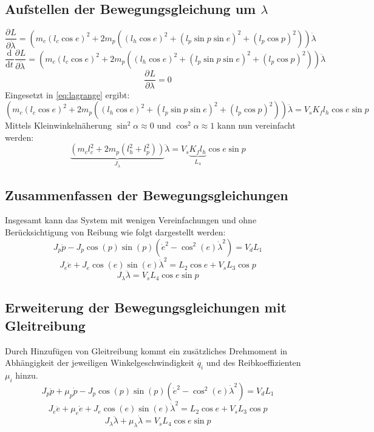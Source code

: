 \documentclass{article}
\newcommand{\partiell}[3][]{\frac{\partial^{#1}#2}{\partial{#3}^{#1}}}
\newcommand{\diff}[3][]{\frac{\mathrm{d}^{#1}#2}{\mathrm{d}{#3}^{#1}}}
\begin{document}
\subsection{Aufstellen der Bewegungsgleichung um $\lambda$}
\begin{equation}
\partiell{L}{\dot{\lambda}} = (m_c (l_c \cos e)^2
+ 2 m_p((l_h \cos e)^2 + (l_p \sin p \sin e)^2+(l_p \cos p)^2))\dot{\lambda}
\end{equation}
\begin{equation}
\diff{}{t}\partiell{L}{\dot{\lambda}} = (m_c (l_c \cos e)^2
+ 2 m_p((l_h \cos e)^2 + (l_p \sin p \sin e)^2+(l_p \cos p)^2))\ddot{\lambda}
\end{equation}
\begin{equation}
\partiell{L}{\lambda} = 0
\end{equation}
Eingesetzt in \eqref{eq:lagrange} ergibt:
\begin{equation}
(m_c (l_c \cos e)^2
+ 2 m_p((l_h \cos e)^2 + (l_p \sin p \sin e)^2+(l_p \cos p)^2))\ddot{\lambda} = V_s K_f l_h \cos e \sin p
\end{equation}
Mittels Kleinwinkelnäherung $\sin^2 \alpha \approx 0$ und $\cos^2 \alpha \approx 1$  kann nun vereinfacht werden:
\begin{equation}
\underbrace{(m_c l_c^2 +  2 m_p(l_h^2 + l_p^2))}_{J_\lambda} \ddot{\lambda} = V_s \underbrace{K_f l_h}_{L_4} \cos e \sin p
\end{equation}
\subsection{Zusammenfassen der Bewegungsgleichungen}
Insgesamt kann das System mit wenigen Vereinfachungen und ohne Berücksichtigung von Reibung wie folgt dargestellt werden:
\begin{equation}
J_p \ddot{p} - J_p \cos (p) \sin (p) (\dot{e}^2- \cos^2 (e) \dot{\lambda}^2) = V_d L_1
\end{equation}
\begin{equation}
J_e\ddot{e} + J_e \cos (e) \sin (e) \dot{\lambda}^2 
= L_2 \cos e + V_s L_3 \cos p
\end{equation}
\begin{equation}
J_\lambda \ddot{\lambda} = V_s L_4 \cos e \sin p
\end{equation}
\subsection{Erweiterung der Bewegungsgleichungen mit Gleitreibung}
Durch Hinzufügen von Gleitreibung kommt ein zusätzliches Drehmoment in Abhängigkeit der jeweiligen Winkelgeschwindigkeit $\dot{q_i}$ und des Reibkoeffizienten $\mu_i$  hinzu.
\begin{equation}
J_p \ddot{p} + \mu_p \dot{p} - J_p \cos (p) \sin (p) (\dot{e}^2- \cos^2 (e) \dot{\lambda}^2) = V_d L_1
\end{equation}
\begin{equation}
J_e\ddot{e} + \mu_e \dot{e} + J_e \cos (e) \sin (e) \dot{\lambda}^2 
= L_2 \cos e + V_s L_3 \cos p
\end{equation}
\begin{equation}
J_\lambda \ddot{\lambda} + \mu_\lambda \dot{\lambda} = V_s L_4 \cos e \sin p
\end{equation}
\end{document}
